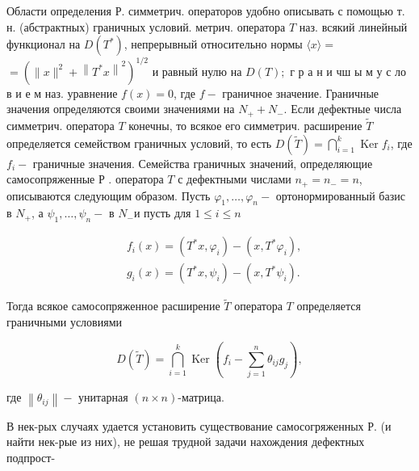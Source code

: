 \documentclass[10pt]{article}
\begin{document}
Области определения Р. симметрич. операторов удобно описывать с помощью т. н. (абстрактных) граничных условий. метрич. оператора $T$ наз. всякий линейный функционал на $D\left(T^{*}\right)$, непрерывный относительно нормы $\langle x\rangle=$ $=\left(\|x\|^{2}+\left\|T^{*} x\right\|^{2}\right)^{1 / 2}$ и равный нулю на $D(T) ;$ г р а н и чш ы м у с ло в и е м наз. уравнение $f(x)=0$, где $f-$ граничное значение. Граничные значения определяются своими значениями на $N_{+}+N_{-}$. Если дефектные числа симметрич. оператора $T$ конечны, то всякое его симметрич. расширение $\tilde{T}$ определяется семейством граничных условий, то есть $D(\tilde{T})=\bigcap_{i=1}^{k} \operatorname{Ker} f_{i}$, где $f_{i}-$ граничные значения. Семейства граничных значений, определяющие самосопряженные Р . оператора $T$ с дефектными числами $n_{+}=n_{-}=n$, описываются следующим образом. Пусть $\varphi_{1}, \ldots, \varphi_{n}-$ ортонормированный базис в $N_{+}$, а $\psi_{1}, \ldots, \psi_{n}-$ в $N_{-}$и пусть для $1 \leqslant i \leqslant n$



\[

\begin{aligned}

& f_{i}(x)=\left(T^{*} x, \varphi_{i}\right)-\left(x, T^{*} \varphi_{i}\right), \\

& g_{i}(x)=\left(T^{*} x, \psi_{i}\right)-\left(x, T^{*} \psi_{i}\right) .

\end{aligned}

\]



Тогда всякое самосопряженное расширение $\tilde{T}$ оператора $T$ определяется граничными условиями



\[

D(\tilde{T})=\bigcap_{i=1}^{k} \operatorname{Ker}\left(f_{i}-\sum_{j=1}^{n} \theta_{i j} g_{j}\right),

\]



где $\left\|\theta_{i j}\right\|-$ унитарная $(n \times n)$-матрица.



В нек-рых случаях удается установить существование самосогряженных Р. (и найти нек-рые из них), не решая трудной задачи нахождения дефектных подпрост-
\end{document}
